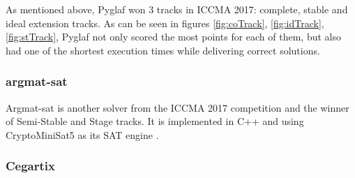 As mentioned above, Pyglaf won 3 tracks in ICCMA 2017: complete, stable and ideal extension tracks. As can be seen in figures \ref{fig:coTrack}, \ref{fig:idTrack}, \ref{fig:stTrack}, Pyglaf not only scored the most points for each of them, but also had one of the shortest execution times while delivering correct solutions.

\subsubsection{argmat-sat}
Argmat-sat is another solver from the ICCMA 2017 competition and the winner of Semi-Stable and Stage tracks. It is implemented in C++ and using CryptoMiniSat5 as its SAT engine \citep{argmatSat}.




\subsubsection{Cegartix}
